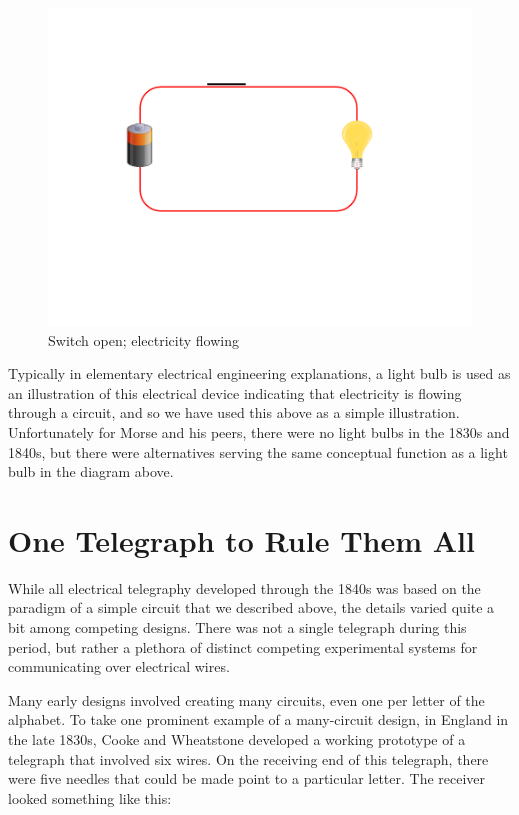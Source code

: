 \documentclass[UTF8]{book}
\begin{document}
\begin{CJK}{UTF8}{gbsn}
\begin{figure}[H]
\centering
\includegraphics[width=0.8\linewidth]{circuit2}
\caption{Switch open; electricity flowing}
\end{figure}

Typically in elementary electrical engineering explanations, a light bulb is used as an illustration of this electrical device indicating that electricity is flowing through a circuit, and so we have used this above as a simple illustration. Unfortunately for Morse and his peers, there were no light bulbs in the 1830s and 1840s, but there were alternatives serving the same conceptual function as a light bulb in the diagram above.

\section{One Telegraph to Rule Them All}

While all electrical telegraphy developed through the 1840s was based on the paradigm of a simple circuit that we described above, the details varied quite a bit among competing designs. There was not a single telegraph during this period, but rather a plethora of distinct competing experimental systems for communicating over electrical wires.

Many early designs involved creating many circuits, even one per letter of the alphabet. To take one prominent example of a many-circuit design, in England in the late 1830s, Cooke and Wheatstone developed a working prototype of a telegraph that involved six wires. On the receiving end of this telegraph, there were five needles that could be made point to a particular letter. The receiver looked something like this:


\end{CJK}
\end{document}
